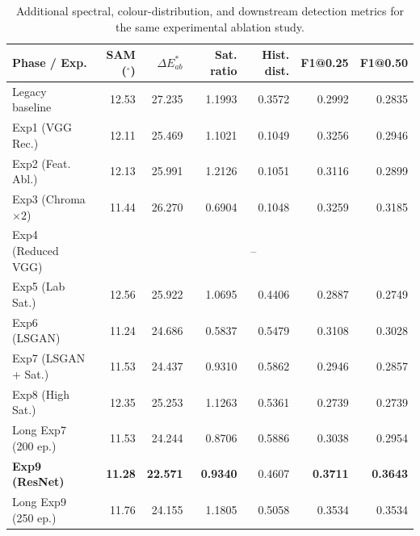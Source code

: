 \documentclass[10pt,a4paper,twoside]{article}
\begin{document}
\begin{table}[htbp]
    \caption{Additional spectral, colour-distribution, and downstream detection metrics for the same experimental ablation study.}
    \label{tab:ablation_metrics}
    \centering
    \scriptsize
    \setlength{\tabcolsep}{2.6pt}
    \begin{tabular}{@{}>{\raggedright\arraybackslash}p{1.8cm}rrrrrr@{}}
        \toprule
        \textbf{Phase / Exp.} & \textbf{SAM ($^\circ$)} & \textbf{$\Delta E^*_{ab}$} & \textbf{Sat. ratio} & \textbf{Hist. dist.} & \textbf{F1@0.25} & \textbf{F1@0.50} \\
        \midrule
        Legacy baseline & 12.53 & 27.235 & 1.1993 & 0.3572 & 0.2992 & 0.2835 \\
        Exp1 (VGG Rec.) & 12.11 & 25.469 & 1.1021 & 0.1049 & 0.3256 & 0.2946 \\
        Exp2 (Feat. Abl.) & 12.13 & 25.991 & 1.2126 & 0.1051 & 0.3116 & 0.2899 \\
        Exp3 (Chroma $\times 2$) & 11.44 & 26.270 & 0.6904 & 0.1048 & 0.3259 & 0.3185 \\
        Exp4 (Reduced VGG) & \multicolumn{6}{c}{--} \\
        Exp5 (Lab Sat.) & 12.56 & 25.922 & 1.0695 & 0.4406 & 0.2887 & 0.2749 \\
        Exp6 (LSGAN) & 11.24 & 24.686 & 0.5837 & 0.5479 & 0.3108 & 0.3028 \\
        Exp7 (LSGAN + Sat.) & 11.53 & 24.437 & 0.9310 & 0.5862 & 0.2946 & 0.2857 \\
        Exp8 (High Sat.) & 12.35 & 25.253 & 1.1263 & 0.5361 & 0.2739 & 0.2739 \\
        Long Exp7 (200 ep.) & 11.53 & 24.244 & 0.8706 & 0.5886 & 0.3038 & 0.2954 \\
        \textbf{Exp9 (ResNet)} & \textbf{11.28} & \textbf{22.571} & \textbf{0.9340} & 0.4607 & \textbf{0.3711} & \textbf{0.3643} \\
        Long Exp9 (250 ep.) & 11.76 & 24.155 & 1.1805 & 0.5058 & 0.3534 & 0.3534 \\
        \bottomrule
    \end{tabular}
\end{table}
\end{document}
